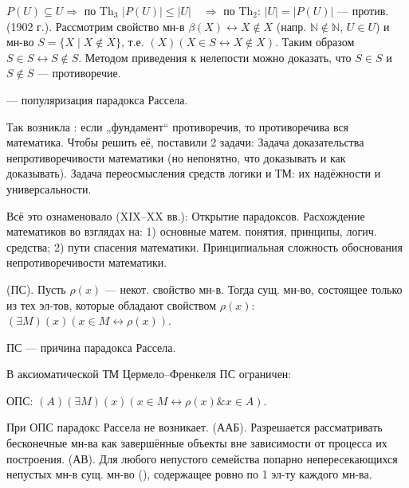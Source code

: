 \hspace*{14mm}$P(U)\subseteq U\Rightarrow$ по Th$_3$ $|P(U)|\le|U|$\ \ $\Rightarrow$ по Th$_2$: $|U|=|P(U)|$ --- против.
  (1902 г.). Рассмотрим свойство мн-в $\beta(X)\leftrightarrow X\notin X$ (напр. $\mathbb{N}\notin\mathbb{N}$, $U\in U$) и мн-во $S=\{X\mid X\notin X\}$, т.е. $(X)(X\in S\leftrightarrow X\notin X)$. Таким образом $S\in S\leftrightarrow S\notin S$. Методом приведения к нелепости можно доказать, что $S\in S$ и $S\notin S$ --- противоречие.\par
{} --- популяризация парадокса Рассела.\par\vspace{1mm}
Так возникла : если „фундамент“ противоречив, то противоречива вся математика. Чтобы решить её, поставили 2 задачи:
 Задача доказательства непротиворечивости математики (но непонятно, что доказывать и как доказывать).
 Задача переосмысления средств логики и ТМ: их надёжности и универсальности.\par
Всё это ознаменовало  (XIX--XX вв.):
 Открытие парадоксов.
 Расхождение математиков во взглядах на: 1) основные матем. понятия, принципы, логич. средства; 2) пути спасения математики.
 Принципиальная сложность обоснования непротиворечивости математики.\par\vspace{1mm}
  (ПС). Пусть $\rho(x)$ --- некот. свойство мн-в. Тогда сущ. мн-во, состоящее только из тех эл-тов, которые обладают свойством $\rho(x)$: $(\exists M)(x)(x\in M\leftrightarrow\rho(x))$.\par
ПС --- причина парадокса Рассела.\par
В аксиоматической ТМ Цермело--Френкеля ПС ограничен:\par
\hspace*{10mm}ОПС: $(A)(\exists M)(x)(x\in M\leftrightarrow\rho(x)\&x\in A)$.\par
При ОПС парадокс Рассела не возникает.
  (ААБ). Разрешается рассматривать бесконечные мн-ва как завершённые объекты вне зависимости от процесса их построения.
  (АВ). Для любого непустого семейства попарно непересекающихся непустых мн-в сущ. мн-во (), содержащее ровно по 1 эл-ту каждого мн-ва.\par
